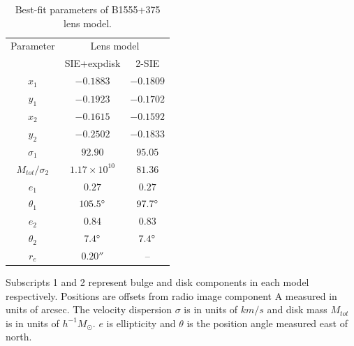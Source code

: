 \documentclass[usenatbib]{mn2e}
\begin{document}
\begin{table}
  \caption{Best-fit parameters of B1555+375 lens model.}
  \begin{tabular}{@{}ccc}
\hline 
 Parameter  & \multicolumn{2}{c}{Lens model} \\
		&SIE+expdisk& 2-SIE		   
\\
\hline
$x_1$  	& $-0.1883$	& $-0.1809$	  \\
$y_1$	&$-0.1923$	&$-0.1702$	  \\
$x_2$	&$-0.1615$ 	&$-0.1592$	  \\
$y_2$	&$-0.2502$	& $-0.1833$	  \\
$\sigma_1$	&$92.90$ &	$95.05$	  \\
$M_{tot} / \sigma_2$& $1.17\times 10^{10} $  &$81.36$ 	 \\  
$e_1$	& $0.27$	& $0.27$ \\  
$\theta_1$	&$105.5 \hbox{$^\circ$}$ & $97.7 \hbox{$^\circ$}$	 \\
$e_2$	&$0.84$	&$0.83$      \\
$\theta_2$	&$7.4\hbox{$^\circ$}$ &$7.4\hbox{$^\circ$}$  \\
$r_e$	& $0.20 ''$ &  -- \\
\hline
\end{tabular}

\medskip
Subscripts 1 and 2 represent bulge and disk components in each model respectively. Positions are offsets from radio image component A measured in units of arcsec. The velocity dispersion $\sigma$ is in units of $km/s$ and disk mass $M_{tot}$ is in units of $h^{-1} M_{\odot}$. $e$ is ellipticity and $\theta$ is the position angle measured east of north.

\end{table}
\end{document}
